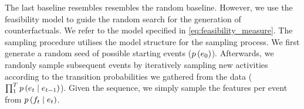 \documentclass[./../../paper.tex]{subfiles}
\begin{document}
The last baseline resembles resembles the random baseline. However, we use the feasibility model to guide the random search for the generation of counterfactuals. We refer to the model specified in \autoref{eq:feasibility_measure}. The sampling procedure utilises the model structure for the sampling process. We first generate a random seed of possible starting events ($p\left(e_0\right)$). Afterwards, we randonly sample subsequent events by iteratively sampling new activities according to the transition probabilities we gathered from the data ($\prod_1^T p\left(e_t \mid e_{t-1}\right)$). Given the sequence, we simply sample the features per event from $p\left(f_t \mid e_t\right)$. 

\end{document}
